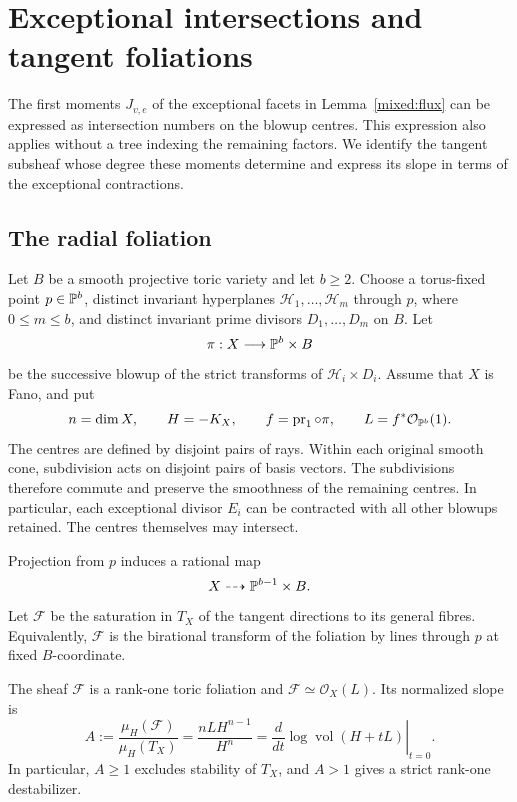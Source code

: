 \section{Exceptional intersections and tangent foliations}
\label{sec:intrinsic}

The first moments $J_{v,e}$ of the exceptional facets in
Lemma~\ref{mixed:flux} can be expressed as intersection numbers on the
blowup centres. This expression also applies without a tree indexing
the remaining factors. We identify the tangent subsheaf whose degree
these moments determine and express its slope in terms of the
exceptional contractions.

\subsection{The radial foliation}

Let $B$ be a smooth projective toric variety and let $b\ge2$. Choose a
torus-fixed point $p\in\mathbb{P}^b$, distinct invariant hyperplanes
$\mathcal H_1,\ldots,\mathcal H_m$ through $p$, where $0\le m\le b$,
and distinct invariant prime divisors $D_1,\ldots,D_m$ on $B$. Let
\[
 \pi:X\longrightarrow\mathbb{P}^b\times B
\]
be the successive blowup of the strict transforms of
$\mathcal H_i\times D_i$. Assume that $X$ is Fano, and put
\begin{equation}\label{intrinsic:classes}
 n=\dim X,\qquad H=-K_X,\qquad
 f=\operatorname{pr}_1\circ\pi,\qquad
 L=f^*\mathcal O_{\mathbb{P}^b}(1).
\end{equation}
The centres are defined by disjoint pairs of rays. Within each original
smooth cone, subdivision acts on disjoint pairs of basis vectors. The
subdivisions therefore commute and preserve the smoothness of the
remaining centres. In particular, each exceptional divisor $E_i$ can
be contracted with all other blowups retained. The centres themselves
may intersect.

Projection from $p$ induces a rational map
\[
 X\dashrightarrow\mathbb{P}^{b-1}\times B.
\]
Let $\mathcal F$ be the saturation in $T_X$ of the tangent directions
to its general fibres. Equivalently, $\mathcal F$ is the birational transform of the foliation
by lines through $p$ at fixed $B$-coordinate.

\begin{proposition}\label{intrinsic:foliation}
The sheaf $\mathcal F$ is a rank-one toric foliation and
$\mathcal F\simeq\mathcal O_X(L)$. Its normalized slope is
\begin{equation}\label{intrinsic:slope}
 A:=\frac{\mu_H(\mathcal F)}{\mu_H(T_X)}
   =\frac{nLH^{n-1}}{H^n}
   =\left.\frac{d}{dt}\log\operatorname{vol}(H+tL)\right|_{t=0}.
\end{equation}
In particular, $A\ge1$ excludes stability of $T_X$, and $A>1$ gives
a strict rank-one destabilizer.
\end{proposition}

